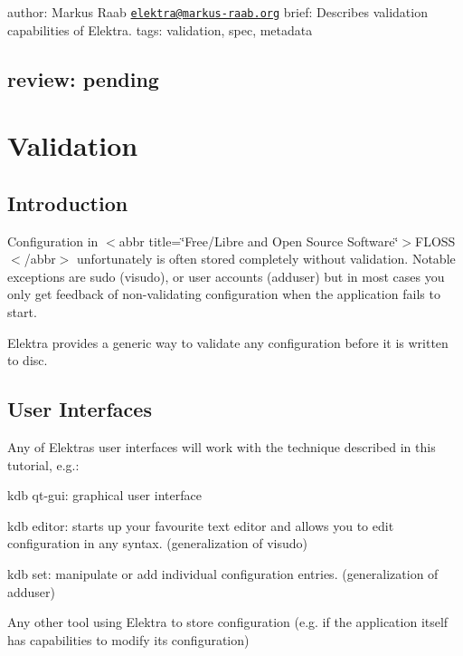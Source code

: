 

 author\+: Markus Raab \href{mailto:elektra@markus-raab.org}{\tt elektra@markus-\/raab.\+org} brief\+: Describes validation capabilities of Elektra. tags\+: validation, spec, metadata \subsection*{review\+: pending }\hypertarget{md_doc_tutorials_validation_doc_tutorials_validation_md}{}\section{Validation}\label{md_doc_tutorials_validation_doc_tutorials_validation_md}
\subsection*{Introduction}

Configuration in $<$abbr title=\char`\"{}\+Free/\+Libre and Open Source Software\char`\"{}$>$F\+L\+O\+SS$<$/abbr$>$ unfortunately is often stored completely without validation. Notable exceptions are sudo ({\ttfamily visudo}), or user accounts ({\ttfamily adduser}) but in most cases you only get feedback of non-\/validating configuration when the application fails to start.

Elektra provides a generic way to validate any configuration before it is written to disc.

\subsection*{User Interfaces}

Any of Elektra\textquotesingle{}s user interfaces will work with the technique described in this tutorial, e.\+g.\+:


\begin{DoxyEnumerate}
\item {\ttfamily kdb qt-\/gui}\+: graphical user interface
\item {\ttfamily kdb editor}\+: starts up your favourite text editor and allows you to edit configuration in any syntax. (generalization of {\ttfamily visudo})
\item {\ttfamily kdb set}\+: manipulate or add individual configuration entries. (generalization of {\ttfamily adduser})
\item Any other tool using Elektra to store configuration (e.\+g. if the application itself has capabilities to modify its configuration)
\end{DoxyEnumerate}

